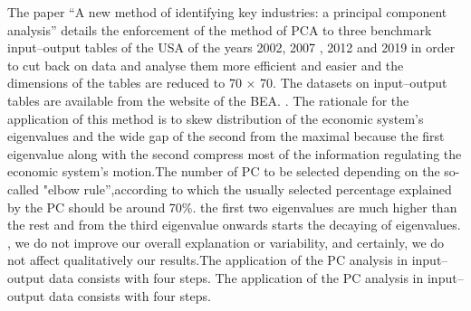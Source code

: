 \documentclass[10pt,a4paper]{article}
\begin{document}
	The paper “A new method of identifying key industries: a principal component analysis” details the enforcement of the method of PCA  to three benchmark input–output tables of the USA of the years 2002, 2007 , 2012 and 2019 in order to cut back on data and analyse them more efficient and easier and the dimensions of the tables are reduced to 70 × 70. The datasets on input–output tables are available from the website of the BEA. . The rationale for the application of this method is to skew distribution of the economic system’s eigenvalues and the wide gap of the second from the maximal because the first eigenvalue along with the second compress most of the information regulating the economic system’s motion.The number of PC to be selected depending on the so-called "elbow rule”,according to which the usually selected percentage explained by the PC should be around 70\%. the first two eigenvalues are much higher than the rest and from the third eigenvalue onwards starts the decaying of eigenvalues. , we do not improve our overall explanation or variability, and certainly, we do not affect qualitatively our results.The application of the PC analysis in input–output data consists with four steps. The application of the PC analysis in input–output data consists with four steps. 
	\\
\end{document}
